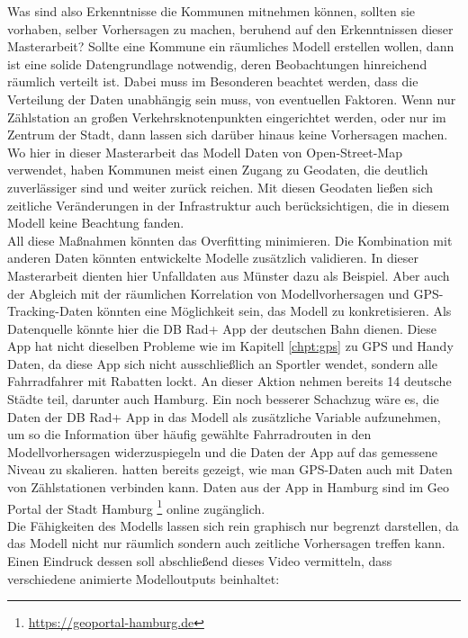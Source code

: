 \documentclass[a4paper,12pt]{thesis}
\begin{document}
Was sind also Erkenntnisse die Kommunen mitnehmen können, sollten sie vorhaben, selber Vorhersagen zu machen, beruhend auf den Erkenntnissen dieser Masterarbeit? Sollte eine Kommune ein räumliches Modell erstellen wollen, dann ist eine solide Datengrundlage notwendig, deren Beobachtungen hinreichend räumlich verteilt ist. Dabei muss im Besonderen beachtet werden, dass die Verteilung der Daten unabhängig sein muss, von eventuellen Faktoren. Wenn nur Zählstation an großen Verkehrsknotenpunkten eingerichtet werden, oder nur im Zentrum der Stadt, dann lassen sich darüber hinaus keine Vorhersagen machen. Wo hier in dieser Masterarbeit das Modell Daten von Open-Street-Map verwendet, haben Kommunen meist einen Zugang zu Geodaten, die deutlich zuverlässiger sind und weiter zurück reichen. Mit diesen Geodaten ließen sich zeitliche Veränderungen in der Infrastruktur auch berücksichtigen, die in diesem Modell keine Beachtung fanden.\\
All diese Maßnahmen könnten das Overfitting minimieren. Die Kombination mit anderen Daten könnten entwickelte Modelle zusätzlich validieren. In dieser Masterarbeit dienten hier Unfalldaten aus Münster dazu als Beispiel. Aber auch der Abgleich mit der räumlichen Korrelation von Modellvorhersagen und GPS-Tracking-Daten könnten eine Möglichkeit sein, das Modell zu konkretisieren. Als Datenquelle könnte hier die DB Rad+ App der deutschen Bahn dienen. Diese App hat nicht dieselben Probleme wie im Kapitell \ref{chpt:gps} zu GPS und Handy Daten, da diese App sich nicht ausschließlich an Sportler wendet, sondern alle Fahrradfahrer mit Rabatten lockt. An dieser Aktion nehmen bereits 14 deutsche Städte teil, darunter auch Hamburg. Ein noch besserer Schachzug wäre es, die Daten der DB Rad+ App in das Modell als zusätzliche Variable aufzunehmen, um so die Information über häufig gewählte Fahrradrouten in den Modellvorhersagen widerzuspiegeln und die Daten der App auf das gemessene Niveau zu skalieren. \cite{Alattar2021} hatten bereits gezeigt, wie man GPS-Daten auch mit Daten von Zählstationen verbinden kann. Daten aus der App in Hamburg sind im Geo Portal der Stadt Hamburg \footnote{\url{https://geoportal-hamburg.de}} online zugänglich.\\

Die Fähigkeiten des Modells lassen sich rein graphisch nur begrenzt darstellen, da das Modell nicht nur räumlich sondern auch zeitliche Vorhersagen treffen kann. Einen Eindruck dessen soll abschließend dieses Video vermitteln, dass verschiedene animierte Modelloutputs beinhaltet:
\end{document}
